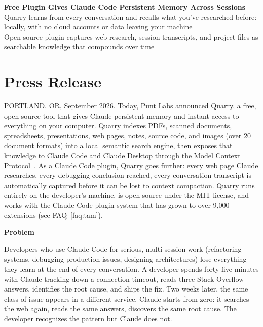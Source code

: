 \documentclass[11pt,letterpaper]{article}
\newcommand{\prsection}[1]{%
  \vspace{1em}%
  {\large\bfseries\color{SectionBlue}#1}%
  \vspace{0.3em}\par%
}
\newcommand{\faqref}[1]{\hyperref[#1]{FAQ~\ref*{#1}}}
\begin{document}
\begin{center}
  {\LARGE\bfseries\color{SectionBlue}
    Free Plugin Gives Claude Code Persistent Memory Across Sessions} \\[0.8em]
  {\large\color{AccentGray}
    Quarry learns from every conversation and recalls what you've researched before: locally, with no cloud accounts or data leaving your machine} \\[0.3em]
  {\large\color{AccentGray}
    Open source plugin captures web research, session transcripts, and project files as searchable knowledge that compounds over time}
\end{center}

\vspace{0.5em}


\section*{Press Release}

PORTLAND, OR, September 2026. Today, Punt Labs announced Quarry, a free,
open-source tool that gives Claude persistent memory and instant access to
everything on your computer. Quarry indexes PDFs, scanned documents,
spreadsheets, presentations, web pages, notes, source code, and images (over
20 document formats) into a local semantic search engine, then exposes that
knowledge to Claude Code and Claude Desktop through the Model Context
Protocol~\cite{aitoolanalysis2026claudeplugins}. As a Claude Code plugin,
Quarry goes further: every web page Claude researches, every debugging
conclusion reached, every conversation transcript is automatically captured
before it can be lost to context compaction. Quarry runs entirely on the
developer's machine, is open source under the MIT license, and works with the
Claude Code plugin system that has grown to over 9{,}000 extensions
(see \faqref{faq:tam}).

\prsection{Problem}

Developers who use Claude Code for serious, multi-session work (refactoring
systems, debugging production issues, designing architectures) lose everything
they learn at the end of every conversation. A developer spends forty-five
minutes with Claude tracking down a connection timeout, reads three Stack
Overflow answers, identifies the root cause, and ships the fix. Two weeks later,
the same class of issue appears in a different service. Claude starts from
zero: it searches the web again, reads the same answers, discovers the same root
cause. The developer recognizes the pattern but Claude does not.
\end{document}
